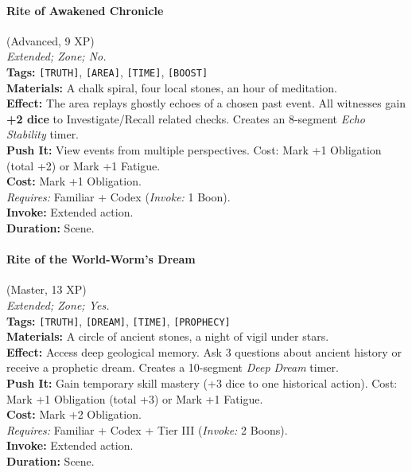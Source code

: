 \paragraph{Rite of Awakened Chronicle} (Advanced, 9 XP) \hfill \\
\emph{Extended; Zone; No.} \\
\textbf{Tags:} \texttt{[TRUTH]}, \texttt{[AREA]}, \texttt{[TIME]}, \texttt{[BOOST]} \\
\textbf{Materials:} A chalk spiral, four local stones, an hour of meditation. \\
\textbf{Effect:} The area replays ghostly echoes of a chosen past event. All witnesses gain \textbf{+2 dice} to Investigate/Recall related checks. Creates an 8-segment \textit{Echo Stability} timer. \\
\textbf{Push It:} View events from multiple perspectives. Cost: Mark +1 Obligation (total +2) or Mark +1 Fatigue. \\
\textbf{Cost:} Mark +1 Obligation. \\
\textit{Requires:} Familiar + Codex (\textit{Invoke:} 1 Boon). \\
\textbf{Invoke:} Extended action. \\
\textbf{Duration:} Scene.

\paragraph{Rite of the World-Worm's Dream} (Master, 13 XP) \hfill \\
\emph{Extended; Zone; Yes.} \\
\textbf{Tags:} \texttt{[TRUTH]}, \texttt{[DREAM]}, \texttt{[TIME]}, \texttt{[PROPHECY]} \\
\textbf{Materials:} A circle of ancient stones, a night of vigil under stars. \\
\textbf{Effect:} Access deep geological memory. Ask 3 questions about ancient history or receive a prophetic dream. Creates a 10-segment \textit{Deep Dream} timer. \\
\textbf{Push It:} Gain temporary skill mastery (+3 dice to one historical action). Cost: Mark +1 Obligation (total +3) or Mark +1 Fatigue. \\
\textbf{Cost:} Mark +2 Obligation. \\
\textit{Requires:} Familiar + Codex + Tier III (\textit{Invoke:} 2 Boons). \\
\textbf{Invoke:} Extended action. \\
\textbf{Duration:} Scene.

